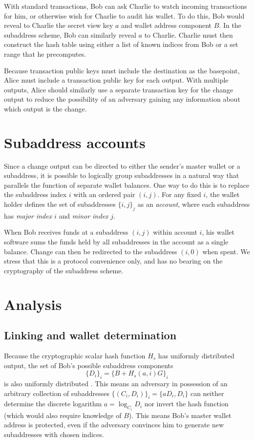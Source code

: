 \documentclass{mrl}
\begin{document}
With standard transactions, Bob can ask Charlie to watch incoming transactions for him, or otherwise wish for Charlie to audit his wallet. To do this, Bob would reveal to Charlie the secret view key $a$ and wallet address component $B$. In the subaddress scheme, Bob can similarly reveal $a$ to Charlie. Charlie must then construct the hash table using either a list of known indices from Bob or a set range that he precomputes.

Because transaction public keys must include the destination as the basepoint, Alice must include a transaction public key for each output. With multiple outputs, Alice should similarly use a separate transaction key for the change output to reduce the possibility of an adversary gaining any information about which output is the change.


\section{Subaddress accounts}
Since a change output can be directed to either the sender's master wallet or a subaddress, it is possible to logically group subaddresses in a natural way that parallels the function of separate wallet balances. One way to do this is to replace the subaddress index $i$ with an ordered pair $(i,j)$. For any fixed $i$, the wallet holder defines the set of subaddresses $\{i,j\}_j$ as an \textit{account}, where each subaddress has \textit{major index} $i$ and \textit{minor index} $j$.

When Bob receives funds at a subaddress $(i,j)$ within account $i$, his wallet software sums the funds held by all subaddresses in the account as a single balance. Change can then be redirected to the subaddress $(i,0)$ when spent. We stress that this is a protocol convenience only, and has no bearing on the cryptography of the subaddress scheme.


\section{Analysis}
\subsection{Linking and wallet determination}
Because the cryptographic scalar hash function $H_s$ has uniformly distributed output, the set of Bob's possible subaddress components $$\{D_i\}_i = \{B + H_s(a,i)G\}_i$$ is also uniformly distributed \cite{uniform}. This means an adversary in possession of an arbitrary collection of subaddresses $\{(C_i,D_i)\}_i = \{aD_i,D_i\}$ can neither determine the discrete logarithm $a = \log_{C_i} D_i$ nor invert the hash function (which would also require knowledge of $B$). This means Bob's master wallet address is protected, even if the adversary convinces him to generate new subaddresses with chosen indices.
\end{document}
